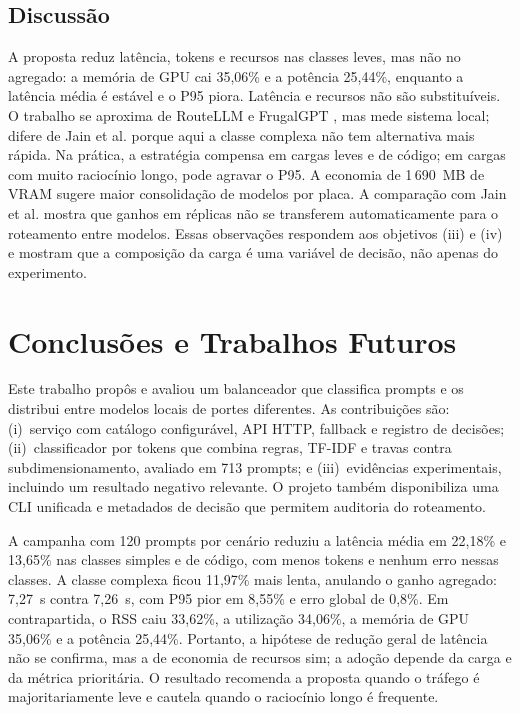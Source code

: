 \documentclass[12pt]{article}
\begin{document}
\subsection{Discussão}

A proposta reduz latência, tokens e recursos nas classes leves, mas não no agregado: a memória de GPU cai 35,06\% e a potência 25,44\%, enquanto a latência média é estável e o P95 piora. Latência e recursos não são substituíveis. O trabalho se aproxima de RouteLLM e FrugalGPT \cite{article:routellm,article:frugalgpt}, mas mede sistema local; difere de Jain et al. \cite{article:performance_lb} porque aqui a classe complexa não tem alternativa mais rápida. Na prática, a estratégia compensa em cargas leves e de código; em cargas com muito raciocínio longo, pode agravar o P95. A economia de 1\,690~MB de VRAM sugere maior consolidação de modelos por placa. A comparação com Jain et al. mostra que ganhos em réplicas não se transferem automaticamente para o roteamento entre modelos. Essas observações respondem aos objetivos (iii) e (iv) e mostram que a composição da carga é uma variável de decisão, não apenas do experimento.

\section{Conclusões e Trabalhos Futuros}

Este trabalho propôs e avaliou um balanceador que classifica prompts e os distribui entre modelos locais de portes diferentes. As contribuições são: (i)~serviço com catálogo configurável, API HTTP, fallback e registro de decisões; (ii)~classificador por tokens que combina regras, TF-IDF e travas contra subdimensionamento, avaliado em 713 prompts; e (iii)~evidências experimentais, incluindo um resultado negativo relevante. O projeto também disponibiliza uma CLI unificada e metadados de decisão que permitem auditoria do roteamento.

A campanha com 120 prompts por cenário reduziu a latência média em 22,18\% e 13,65\% nas classes simples e de código, com menos tokens e nenhum erro nessas classes. A classe complexa ficou 11,97\% mais lenta, anulando o ganho agregado: 7,27~s contra 7,26~s, com P95 pior em 8,55\% e erro global de 0,8\%. Em contrapartida, o RSS caiu 33,62\%, a utilização 34,06\%, a memória de GPU 35,06\% e a potência 25,44\%. Portanto, a hipótese de redução geral de latência não se confirma, mas a de economia de recursos sim; a adoção depende da carga e da métrica prioritária. O resultado recomenda a proposta quando o tráfego é majoritariamente leve e cautela quando o raciocínio longo é frequente.
\end{document}
